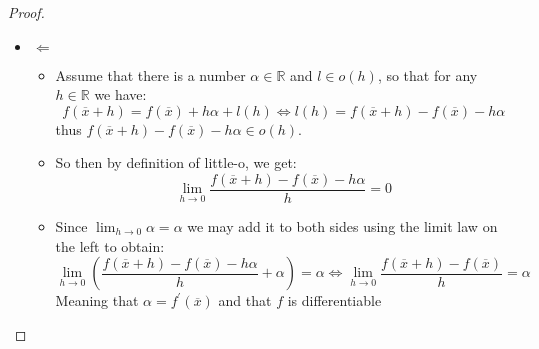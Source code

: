 \begin{proof}
\begin{itemize}
      \item $\Leftarrow$ 
        \begin{itemize}
          \item Assume that there is a number $\alpha \in \mathbb{R}$ and $l \in o\left(h\right)$, so that for any $h \in \mathbb{R}$  we have:
            \[
            f\left(\overline{x}  +  h\right) = f\left(\overline{x}\right)  +  h \alpha+  l\left(h\right) \Leftrightarrow l\left(h\right) = f\left(\overline{x}  +  h\right)  -  f\left(\overline{x}\right)  -  h \alpha
            \]
            thus $f\left(\overline{x}  +  h\right)  -  f\left(\overline{x}\right)  -  h \alpha \in o\left(h\right)$.
            \item So then by definition of little-o, we get:
            \[
           \lim_{h\to0} \frac{f\left(\overline{x}  +  h\right)  -  f\left(\overline{x}\right)  -  h \alpha }{h} = 0
            \]
            \item Since $ \lim_{ h \to 0 } \alpha = \alpha $ we may add it to both sides using the limit law on the left to obtain:
            \[
            \lim_{ h \to 0 } \left( \frac{f\left( \overline{x} +  h \right) -  f\left( \overline{x} \right) -  h \alpha }{h} + \alpha  \right)= \alpha \Leftrightarrow \lim_{ h \to 0 } \frac{f\left( \overline{x} + h \right) -  f\left( \overline{x} \right) }{h} = \alpha 
            \]
            Meaning that $ \alpha = f ^{ \prime } \left( \overline{x} \right)  $ and that $ f $ is differentiable
        \end{itemize}
    \end{itemize}
\end{proof}
